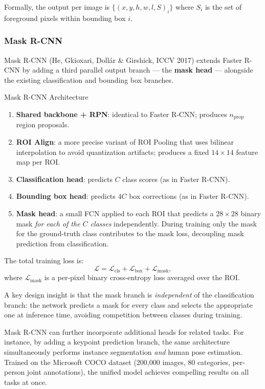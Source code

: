 \documentclass[11pt,a4paper]{article}
\newcommand{\term}[1]{\textcolor{DefGreen}{\textbf{#1}}\index{#1}}
\begin{document}
Formally, the output per image is $\{(x, y, h, w, l, S)_i\}$ where $S_i$ is the set of foreground pixels within bounding box $i$.

\subsubsection{Mask R-CNN}

Mask R-CNN (He, Gkioxari, Dollár \& Girshick, ICCV 2017) extends Faster R-CNN by adding a third parallel output branch — the \term{mask head} — alongside the existing classification and bounding box branches.

\begin{thmbox}{Mask R-CNN Architecture}
\begin{enumerate}
  \item \textbf{Shared backbone + RPN}: identical to Faster R-CNN; produces $n_\text{prop}$ region proposals.
  \item \textbf{ROI Align}: a more precise variant of ROI Pooling that uses bilinear interpolation to avoid quantization artifacts; produces a fixed $14 \times 14$ feature map per ROI.
  \item \textbf{Classification head}: predicts $C$ class scores (as in Faster R-CNN).
  \item \textbf{Bounding box head}: predicts $4C$ box corrections (as in Faster R-CNN).
  \item \textbf{Mask head}: a small FCN applied to each ROI that predicts a $28 \times 28$ binary mask \emph{for each of the $C$ classes} independently. During training only the mask for the ground-truth class contributes to the mask loss, decoupling mask prediction from classification.
\end{enumerate}
The total training loss is:
\[
  \mathcal{L} = \mathcal{L}_\text{cls} + \mathcal{L}_\text{box} + \mathcal{L}_\text{mask},
\]
where $\mathcal{L}_\text{mask}$ is a per-pixel binary cross-entropy loss averaged over the ROI.
\end{thmbox}

A key design insight is that the mask branch is \emph{independent} of the classification branch: the network predicts a mask for every class and selects the appropriate one at inference time, avoiding competition between classes during training.

Mask R-CNN can further incorporate additional heads for related tasks. For instance, by adding a keypoint prediction branch, the same architecture simultaneously performs instance segmentation \emph{and} human pose estimation. Trained on the Microsoft COCO dataset (200,000 images, 80 categories, per-person joint annotations), the unified model achieves compelling results on all tasks at once.
\end{document}
